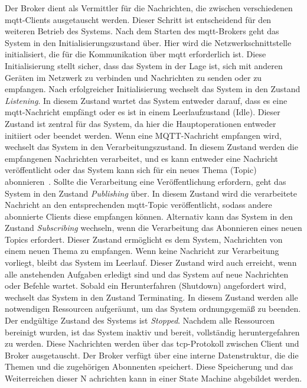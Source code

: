 Der Broker dient als Vermittler für die Nachrichten, die zwischen verschiedenen \gls{mqtt}-Clients ausgetauscht werden.
Dieser Schritt ist entscheidend für den weiteren Betrieb des Systems.
Nach dem Starten des \gls{mqtt}-Brokers geht das System in den Initialisierungszustand über.
Hier wird die Netzwerkschnittstelle initialisiert, die für die Kommunikation über \gls{mqtt} erforderlich ist.
Diese Initialisierung stellt sicher, dass das System in der Lage ist, sich mit anderen Geräten im Netzwerk zu verbinden
und Nachrichten zu senden oder zu empfangen.
Nach erfolgreicher Initialisierung wechselt das System in den Zustand \textit{Listening}.
In diesem Zustand wartet das System entweder darauf, dass es eine \gls{mqtt}-Nachricht empfängt oder es ist in einem Leerlaufzustand (Idle).
Dieser Zustand ist zentral für das System, da hier die Hauptoperationen entweder initiiert oder beendet werden.
Wenn eine MQTT-Nachricht empfangen wird, wechselt das System in den Verarbeitungszustand.
In diesem Zustand werden die empfangenen Nachrichten verarbeitet, und es kann entweder eine Nachricht veröffentlicht oder
das System kann sich für ein neues Thema (Topic) abonnieren~\cite{mqtt-manpage}.
Sollte die Verarbeitung eine Veröffentlichung erfordern, geht das System in den Zustand \textit{Publishing} über.
In diesem Zustand wird die verarbeitete Nachricht an den entsprechenden \gls{mqtt}-Topic veröffentlicht, sodass andere
abonnierte Clients diese empfangen können.
Alternativ kann das System in den Zustand \textit{Subscribing} wechseln, wenn die Verarbeitung das Abonnieren eines neuen Topics erfordert.
Dieser Zustand ermöglicht es dem System, Nachrichten von einem neuen Thema zu empfangen.
Wenn keine Nachricht zur Verarbeitung vorliegt, bleibt das System im Leerlauf.
Dieser Zustand wird auch erreicht, wenn alle anstehenden Aufgaben erledigt sind und das System auf neue Nachrichten oder Befehle wartet.
Sobald ein Herunterfahren (Shutdown) angefordert wird, wechselt das System in den Zustand Terminating.
In diesem Zustand werden alle notwendigen Ressourcen aufgeräumt, um das System ordnungsgemäß zu beenden.
Der endgültige Zustand des Systems ist \textit{Stopped}.
Nachdem alle Ressourcen bereinigt wurden, ist das System inaktiv und bereit, vollständig heruntergefahren zu werden.\newline
Diese Nachrichten werden über das \gls{tcp}-Protokoll zwischen Client und Broker ausgetauscht.
Der Broker verfügt über eine interne Datenstruktur, die die Themen und die zugehörigen Abonnenten speichert.
Diese Speicherung und das Weiterreichen dieser N
achrichten kann in einer State Machine abgebildet werden.
